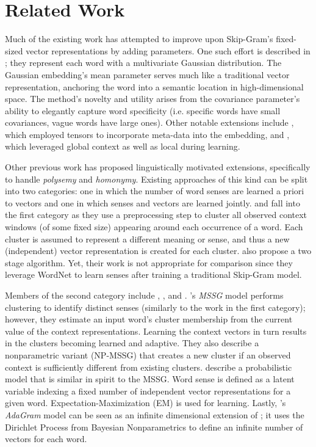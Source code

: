 \documentclass{article} %
\begin{document}
\section{Related Work}\label{related}
Much of the existing work has attempted to improve upon Skip-Gram's fixed-sized vector representations by adding parameters.  One such effort is described in \cite{vilnis2014word}; they represent each word with a multivariate Gaussian distribution.  The Gaussian embedding's mean parameter serves much like a traditional vector representation, anchoring the word into a semantic location in high-dimensional space.  The method's novelty and utility arises from the covariance parameter's ability to elegantly capture word specificity (i.e. specific words have small covariances, vague words have large ones).  Other notable extensions include \cite{kiros2014multiplicative}, which employed tensors to incorporate meta-data into the embedding, and \cite{pennington2014glove}, which leveraged global context as well as local during learning.

Other previous work has proposed linguistically motivated extensions, specifically to handle \textit{polysemy} and \textit{homonymy}.  Existing approaches of this kind can be split into two categories: one in which the number of word senses are learned a priori to vectors and one in which senses and vectors are learned jointly.  \cite{HuangEtAl2012} and \cite{reisinger2010multi} fall into the first category as they use a preprocessing step to cluster all observed context windows (of some fixed size) appearing around each occurrence of a word.  Each cluster is assumed to represent a different meaning or sense, and thus a new (independent) vector representation is created for each cluster.  \cite{chen2014unified} also propose a two stage algorithm.  Yet, their work is not appropriate for comparison since they leverage WordNet to learn senses after training a traditional Skip-Gram model.  

Members of the second category include \cite{neelakantan2015efficient}, \cite{tian2014probabilistic}, and \cite{bartunov2015breaking}.  \cite{neelakantan2015efficient}'s \textit{MSSG} model performs clustering to identify distinct senses (similarly to the work in the first category); however, they estimate an input word's cluster membership from the current value of the context representations.  Learning the context vectors in turn results in the clusters becoming learned and adaptive.  They also describe a nonparametric variant (NP-MSSG) that creates a new cluster if an observed context is sufficiently different from existing clusters.  \cite{tian2014probabilistic} describe a probabilistic model that is similar in spirit to the MSSG.  Word sense is defined as a latent variable indexing a fixed number of independent vector representations for a given word.  Expectation-Maximization (EM) is used for learning.  Lastly, \cite{bartunov2015breaking}'s \textit{AdaGram} model can be seen as an infinite dimensional extension of \cite{tian2014probabilistic}; it uses the Dirichlet Process from Bayesian Nonparametrics to define an infinite number of vectors for each word.     
\end{document}
